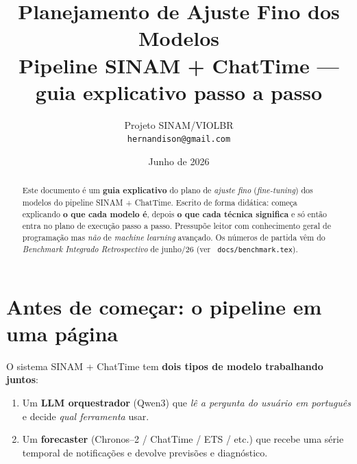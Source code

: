 \documentclass[11pt,a4paper]{article}
\title{\textbf{Planejamento de Ajuste Fino dos Modelos}\\
  \large Pipeline SINAM + ChatTime --- guia explicativo passo a passo}
\author{Projeto SINAM/VIOLBR \\ \small \texttt{hernandison@gmail.com}}
\date{Junho de 2026}
\newcommand{\file}[1]{\texttt{\small\color{black!75} #1}}
\begin{document}
\maketitle

\begin{abstract}
Este documento é um \textbf{guia explicativo} do plano de \emph{ajuste
fino} (\emph{fine-tuning}) dos modelos do pipeline SINAM + ChatTime.
Escrito de forma didática: começa explicando \textbf{o que cada modelo
é}, depois \textbf{o que cada técnica significa} e só então entra no
plano de execução passo a passo. Pressupõe leitor com conhecimento
geral de programação mas \emph{não} de \emph{machine learning} avançado.
Os números de partida vêm do \emph{Benchmark Integrado Retrospectivo}
de junho/26 (ver \file{docs/benchmark.tex}).
\end{abstract}

\tableofcontents
\vspace{1em}

\section{Antes de começar: o pipeline em uma página}

O sistema SINAM + ChatTime tem \textbf{dois tipos de modelo trabalhando
juntos}:

\begin{enumerate}[leftmargin=*]
\item Um \textbf{LLM orquestrador} (Qwen3) que \emph{lê a pergunta do
usuário em português} e decide \emph{qual ferramenta} usar.
\item Um \textbf{forecaster} (Chronos--2 / ChatTime / ETS / etc.) que
recebe uma série temporal de notificações e devolve previsões e
diagnóstico.
\end{enumerate}
\end{document}
